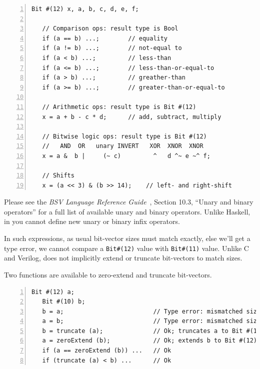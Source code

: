 
{\footnotesize
\begin{Verbatim}[frame=single, numbers=left]
   Bit #(12) x, a, b, c, d, e, f;

   // Comparison ops: result type is Bool
   if (a == b) ...;        // equality
   if (a != b) ...;        // not-equal to
   if (a < b) ...;         // less-than
   if (a <= b) ...;        // less-than-or-equal-to
   if (a > b) ...;         // greather-than
   if (a >= b) ...;        // greater-than-or-equal-to

   // Arithmetic ops: result type is Bit #(12)
   x = a + b - c * d;      // add, subtract, multiply

   // Bitwise logic ops: result type is Bit #(12)
   //   AND  OR   unary INVERT   XOR  XNOR  XNOR
   x = a &  b |     (~ c)         ^   d ^~ e ~^ f;

   // Shifts
   x = (a << 3) & (b >> 14);    // left- and right-shift
\end{Verbatim}
}

Please see the \emph{BSV Language Reference Guide}~\cite{BLang2000},
Section 10.3, ``Unary and binary operators'' for a full list of
available unary and binary operators.  Unlike Haskell, in {\BSV} you
cannot define new unary or binary infix operators.

In such expressions, as usual bit-vector sizes must match exactly,
else we'll get a type error, {\eg} we cannot compare a
\verb|Bit#(12)| value with \verb|Bit#(11)| value.  Unlike C and
Verilog, {\BSV} does not implicitly extend or truncate bit-vectors to
match sizes.


Two functions are available to zero-extend and truncate bit-vectors.

{\footnotesize
\begin{Verbatim}[frame=single, numbers=left]
   Bit #(12) a;
   Bit #(10) b;
   b = a;                         // Type error: mismatched sizes
   a = b;                         // Type error: mismatched sizes
   b = truncate (a);              // Ok; truncates a to Bit #(10), then assigns
   a = zeroExtend (b);            // Ok; extends b to Bit #(12), then assigns
   if (a == zeroExtend (b)) ...   // Ok
   if (truncate (a) < b) ...      // Ok
\end{Verbatim}
}

